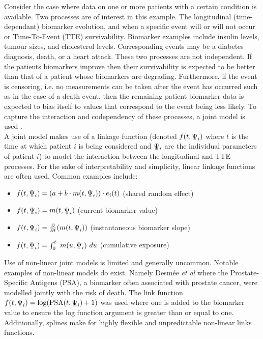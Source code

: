 \documentclass[english]{article}
\newcommand{\ubar}[1]{\text{\b{$#1$}}}
\theoremstyle{plain}
\begin{document}
Consider the case where data on one or more patients with a certain condition is available. Two processes are of interest in this example. The longitudinal (time-dependant) biomarker evolution, and when a specific event will or will not occur or Time-To-Event (TTE) survivability. Biomarker examples include insulin levels, tumour sizes, and cholesterol levels. Corresponding events may be a diabetes diagnosis, death, or a heart attack. These two processes are not independent. If the patients biomarkers improve then their survivability is expected to be better than that of a patient whose biomarkers are degrading. Furthermore, if the event is censoring, i.e. no measurements can be taken after the event has occurred such as in the case of a death event, then the remaining patient biomarker data is expected to bias itself to values that correspond to the event being less likely. To capture the interaction and codependency of these processes, a joint model is used \cite{Marion2022}.
\\

A joint model \cite{riz} makes use of a linkage function (denoted $f(t, \ubar{\Psi}_i)$ where $t$ is the time at which patient $i$ is being considered and $\ubar{\Psi}_i$ are the individual parameters of patient $i$) to model the interaction between the longitudinal and TTE processes. For the sake of interpretability and simplicity, linear linkage functions are often used. Common examples include:
\begin{itemize}
	\item $f(t, \ubar{\Psi}_i) = (a + b \cdot m(t, \ubar{\Psi}_i)) \cdot e_i(t)$ (shared random effect)
	\item $f(t, \ubar{\Psi}_i) = m(t, \ubar{\Psi}_i)$ (current biomarker value)
	\item $f(t, \ubar{\Psi}_i) = \frac{\partial}{\partial t} (m(t, \ubar{\Psi}_i))$ (instantaneous biomarker slope)
	\item $f(t, \ubar{\Psi}_i) = \int_0^t\ m(u, \ubar{\Psi}_i)\ du$ (cumulative exposure)
\end{itemize}


Use of non-linear joint models is limited and generally uncommon. Notable examples of non-linear models do exist. Namely Desm\'ee \emph{et al}  \cite{desmee2020} where the Prostate-Specific Antigens (PSA), a biomarker often associated with prostate cancer, were modelled jointly with the risk of death. The link function $f(t, \ubar{\Psi}_i) = \mathrm{log}(\mathrm{PSA}(t, \ubar{\Psi}_i) + 1)$ was used where one is added to the biomarker value to ensure the log function argument is greater than or equal to one. Additionally, splines make for highly flexible and unpredictable non-linear links functions.
\\
\end{document}
